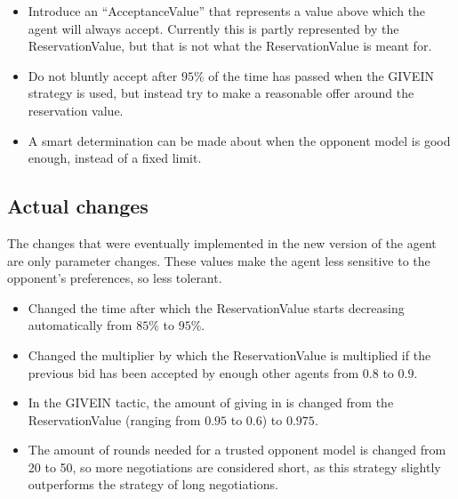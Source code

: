 \begin{itemize}
\item Introduce an ``AcceptanceValue'' that represents a value above which the agent will always accept. Currently this is partly represented by the ReservationValue, but that is not what the ReservationValue is meant for.
\item Do not bluntly accept after $95\%$ of the time has passed when the GIVEIN strategy is used, but instead try to make a reasonable offer around the reservation value.
\item A smart determination can be made about when the opponent model is good enough, instead of a fixed limit.
\end{itemize}

\subsection{Actual changes}
The changes that were eventually implemented in the new version of the agent are only parameter changes. These values make the agent less sensitive to the opponent's preferences, so less tolerant.

\begin{itemize}
\item Changed the time after which the ReservationValue starts decreasing automatically from $85\%$ to $95\%$.
\item Changed the multiplier by which the ReservationValue is multiplied if the previous bid has been accepted by enough other agents from $0.8$ to $0.9$.
\item In the GIVEIN tactic, the amount of giving in is changed from the ReservationValue (ranging from $0.95$ to $0.6$) to $0.975$.
\item The amount of rounds needed for a trusted opponent model is changed from 20 to 50, so more negotiations are considered short, as this strategy slightly outperforms the strategy of long negotiations.
\end{itemize}